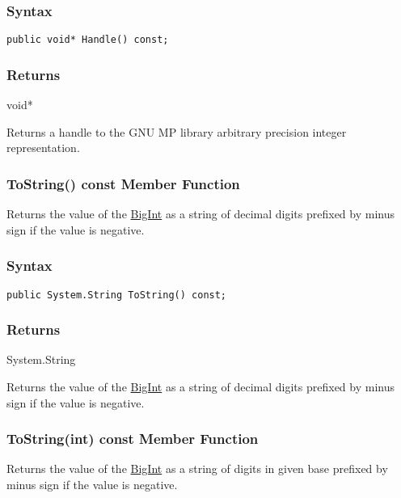 \documentclass[a4paper,oneside,11.000000pt]{book}
\begin{document}
\subsubsection*{Syntax}\texttt{public void* Handle() const;}

\subsubsection*{Returns}void*
\begin{flushleft}
Returns a handle to the GNU MP library arbitrary precision integer representation.

\end{flushleft}
\clearpage

\hypertarget{System.Numerics.Multiprecision.BigInt.ToString.C.P.System.Numerics.Multiprecision.BigInt}{\subsubsection*{ToString() const Member Function}}
\begin{flushleft}
Returns the value of the \hyperlink{System.Numerics.Multiprecision.BigInt}{BigInt} as a string of decimal digits prefixed by minus sign if the value is negative.

\end{flushleft}
\subsubsection*{Syntax}\texttt{public System.String ToString() const;}

\subsubsection*{Returns}System.\-String
\begin{flushleft}
Returns the value of the \hyperlink{System.Numerics.Multiprecision.BigInt}{BigInt} as a string of decimal digits prefixed by minus sign if the value is negative.

\end{flushleft}
\clearpage

\hypertarget{System.Numerics.Multiprecision.BigInt.ToString.C.P.System.Numerics.Multiprecision.BigInt.int}{\subsubsection*{ToString(int) const Member Function}}
\begin{flushleft}
Returns the value of the \hyperlink{System.Numerics.Multiprecision.BigInt}{BigInt} as a string of digits in given base prefixed by minus sign if the value is negative.

\end{flushleft}
\end{document}
